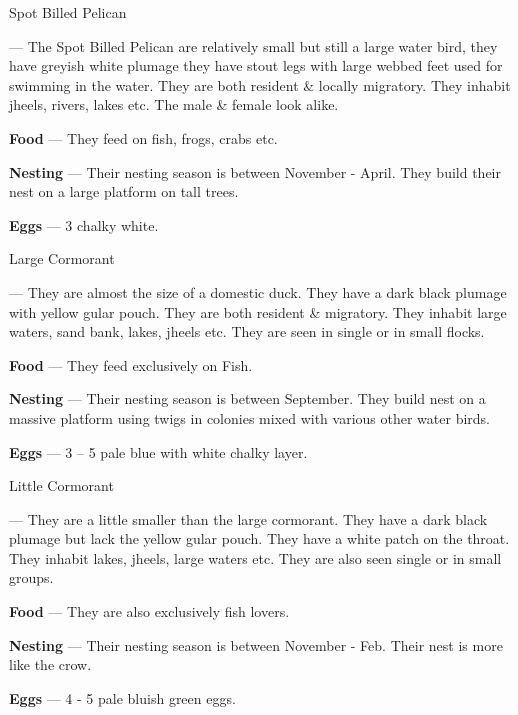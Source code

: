 \begin{bird}{Spot Billed Pelican}

 --- The Spot Billed Pelican are relatively small but still a large water bird, they have greyish white plumage they have  stout legs with large webbed feet used for swimming in the water. They are both resident \& locally migratory. They inhabit jheels, rivers, lakes etc. The male \& female look alike. 

{\large\bf Food} --- They feed on fish, frogs, crabs etc.

{\large\bf Nesting} --- Their nesting season is between November - April. They build their nest on a large platform on tall trees.

{\large\bf Eggs} --- 3 chalky white.
\end{bird}

\begin{bird}{Large Cormorant}

 --- They are almost the size of a domestic duck. They have a dark black plumage with yellow gular pouch. They are both resident \& migratory. They inhabit large waters, sand bank, lakes, jheels etc. They are seen in single or in small flocks.

{\large\bf Food} --- They feed exclusively on Fish.

{\large\bf Nesting} --- Their nesting season is between September. They build nest on a massive platform using twigs in colonies mixed with various other water birds. 

{\large\bf Eggs} --- 3 -- 5 pale blue with white chalky layer. 
\end{bird}

\begin{bird}{Little Cormorant}

 --- They are a little smaller than the large cormorant. They have a dark black plumage but lack the yellow gular pouch. They have a white patch on the throat. They inhabit lakes, jheels, large waters etc. They are also seen single or in small groups. 

{\large\bf Food} --- They are also exclusively fish lovers.

{\large\bf Nesting} --- Their nesting season is between November - Feb. Their nest is more like the crow. 

{\large\bf Eggs} --- 4 - 5 pale bluish green eggs.
\end{bird}

